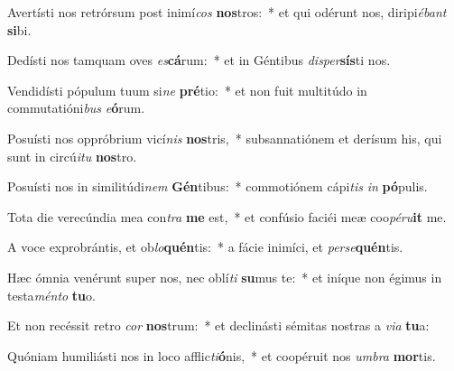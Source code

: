 \item Avertísti nos retrórsum post inimí\textit{cos} \textbf{nos}tros:~* et qui odérunt nos, diripi\textit{é}\textit{bant} \textbf{si}bi.
\item Dedísti nos tamquam oves \textit{es}\textbf{cá}rum:~* et in Géntibus \textit{di}\textit{sper}\textbf{sís}ti nos.
\item Vendidísti pópulum tuum si\textit{ne} \textbf{pré}tio:~* et non fuit multitúdo in commutatióni\textit{bus} \textit{e}\textbf{ó}rum.
\item Posuísti nos oppróbrium vicí\textit{nis} \textbf{nos}tris,~* subsannatiónem et derísum his, qui sunt in circú\textit{i}\textit{tu} \textbf{nos}tro.
\item Posuísti nos in similitúdi\textit{nem} \textbf{Gén}tibus:~* commotiónem cápi\textit{tis} \textit{in} \textbf{pó}pulis.
\item Tota die verecúndia mea con\textit{tra} \textbf{me} est,~* et confúsio faciéi meæ coo\textit{pé}\textit{ru}\textbf{it} me.
\item A voce exprobrántis, et ob\textit{lo}\textbf{quén}tis:~* a fácie inimíci, et \textit{per}\textit{se}\textbf{quén}tis.
\item Hæc ómnia venérunt super nos, nec oblí\textit{ti} \textbf{su}mus te:~* et iníque non égimus in testa\textit{mén}\textit{to} \textbf{tu}o.
\item Et non recéssit retro \textit{cor} \textbf{nos}trum:~* et declinásti sémitas nostras a \textit{vi}\textit{a} \textbf{tu}a:
\item Quóniam humiliásti nos in loco afflic\textit{ti}\textbf{ó}nis,~* et coopéruit nos \textit{um}\textit{bra} \textbf{mor}tis.
